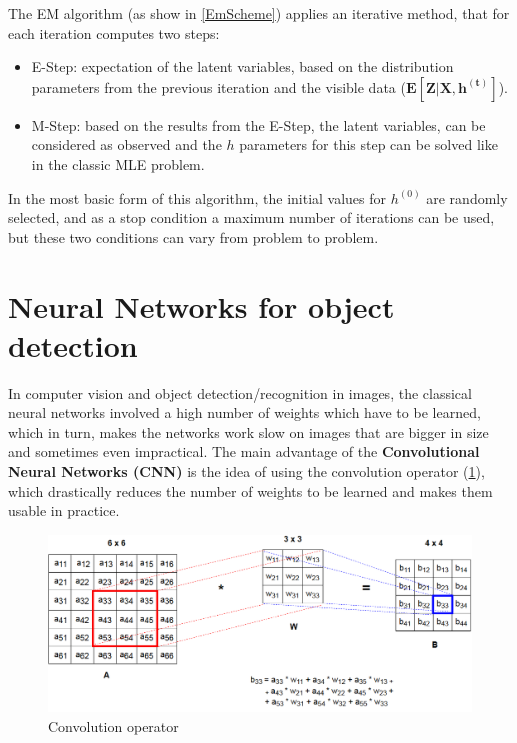  The EM algorithm (as show in \ref{EmScheme}) applies an iterative method, that for each iteration computes two steps:
 \begin{itemize}
 	\item E-Step: expectation of the latent variables, based on the distribution parameters from the previous iteration and the visible data ($\mathbf{E[Z | X, h^{(t)}]}$).
 	\item M-Step: based on the results from the E-Step, the latent variables, can be considered as observed and the $h$ parameters for this step can be solved like in the classic MLE problem.
 \end{itemize}

In the most basic form of this algorithm, the initial values for $h^{(0)}$ are randomly selected, and as a stop condition a maximum number of iterations can be used, but these two conditions can vary from problem to problem.
 
 
 

\section{Neural Networks for object detection}
In computer vision and object detection/recognition in images, the classical neural networks involved a high number of weights which have to be learned, which in turn, makes the networks work slow on images that are bigger in size and sometimes even impractical. The main advantage of the \textbf{Convolutional Neural Networks (CNN)} \cite{ConvNeuralNetwork} is the idea of using the convolution operator (\ref{Convolution}), which drastically reduces the number of weights to be learned and makes them usable in practice.

 \begin{figure}[H]
	\includegraphics[width=\textwidth]{Pictures/006Convolution.png}
	\caption{Convolution operator \cite{ConvNeuralNetwork}}
	\label{Convolution}
\end{figure}

